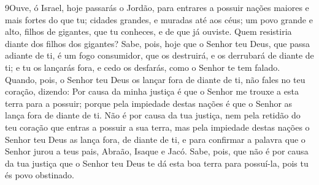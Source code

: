 \medskip

\lettrine{9} Ouve, ó Israel, hoje passarás o Jordão, para
entrares a possuir nações maiores e mais fortes do que tu; cidades
grandes, e muradas até aos céus; um povo grande e alto, filhos
de gigantes, que tu conheces, e de que já ouviste. Quem resistiria
diante dos filhos dos gigantes? Sabe, pois, hoje que o Senhor
teu Deus, que passa adiante de ti, é um fogo consumidor, que os
destruirá, e os derrubará de diante de ti; e tu os lançarás fora, e
cedo os desfarás, como o Senhor te tem falado. Quando, pois, o
Senhor teu Deus os lançar fora de diante de ti, não fales no teu
coração, dizendo: Por causa da minha justiça é que o Senhor me
trouxe a esta terra para a possuir; porque pela impiedade destas
nações é que o Senhor as lança fora de diante de ti. Não é por
causa da tua justiça, nem pela retidão do teu coração que entras a
possuir a sua terra, mas pela impiedade destas nações o Senhor teu
Deus as lança fora, de diante de ti, e para confirmar a palavra que
o Senhor jurou a teus pais, Abraão, Isaque e Jacó. Sabe, pois,
que não é por causa da tua justiça que o Senhor teu Deus te dá esta
boa terra para possuí-la, pois tu és povo obstinado.

